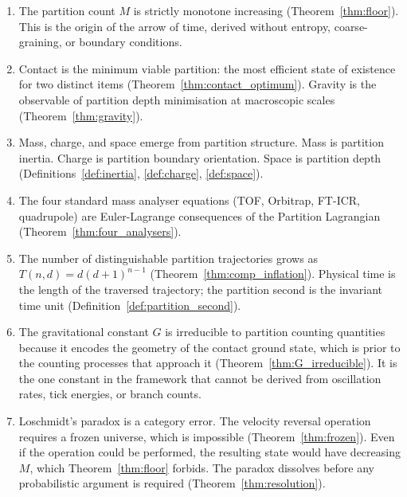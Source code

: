 \documentclass[11pt,twocolumn,a4paper]{article}
\theoremstyle{plain}
\theoremstyle{definition}
\theoremstyle{remark}
\begin{document}
\begin{enumerate}
\item The partition count $M$ is strictly monotone increasing
      (Theorem~\ref{thm:floor}). This is the origin of the arrow of time, derived
      without entropy, coarse-graining, or boundary conditions.

\item Contact is the minimum viable partition: the most efficient state of
      existence for two distinct items (Theorem~\ref{thm:contact_optimum}).
      Gravity is the observable of partition depth minimisation at macroscopic
      scales (Theorem~\ref{thm:gravity}).

\item Mass, charge, and space emerge from partition structure. Mass is partition
      inertia. Charge is partition boundary orientation. Space is partition depth
      (Definitions~\ref{def:inertia}, \ref{def:charge}, \ref{def:space}).

\item The four standard mass analyser equations (TOF, Orbitrap, FT-ICR,
      quadrupole) are Euler-Lagrange consequences of the Partition Lagrangian
      (Theorem~\ref{thm:four_analysers}).

\item The number of distinguishable partition trajectories grows as $T(n,d) =
      d(d+1)^{n-1}$ (Theorem~\ref{thm:comp_inflation}). Physical time is the
      length of the traversed trajectory; the partition second is the invariant
      time unit (Definition~\ref{def:partition_second}).

\item The gravitational constant $G$ is irreducible to partition counting
      quantities because it encodes the geometry of the contact ground state,
      which is prior to the counting processes that approach it
      (Theorem~\ref{thm:G_irreducible}). It is the one constant in the framework
      that cannot be derived from oscillation rates, tick energies, or branch
      counts.

\item Loschmidt's paradox is a category error. The velocity reversal operation
      requires a frozen universe, which is impossible (Theorem~\ref{thm:frozen}).
      Even if the operation could be performed, the resulting state would have
      decreasing $M$, which Theorem~\ref{thm:floor} forbids. The paradox
      dissolves before any probabilistic argument is required
      (Theorem~\ref{thm:resolution}).
\end{enumerate}
\end{document}

